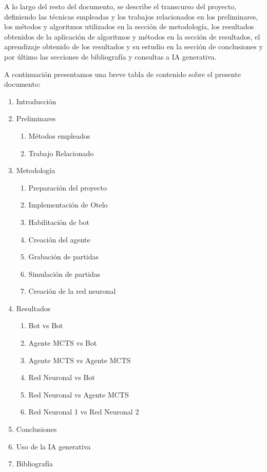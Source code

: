 \documentclass[conference,a4paper]{IEEEtran}
\begin{document}
A lo largo del resto del documento, se describe el transcurso del proyecto, definiendo las técnicas
empleadas y los trabajos relacionados en los preliminares, los métodos y algoritmos utilizados en la
sección de metodología, los resultados obtenidos de la aplicación de algoritmos y métodos en la sección
de resultados, el aprendizaje obtenido de los resultados y su estudio en la sección de conclusiones y
por último las secciones de bibliografía y consultas a IA generativa.

A continuación presentamos una breve tabla de contenido sobre el presente documento:

\begin{enumerate}
  \item Introducción
  \item Preliminares
  \begin{enumerate}
    \item Métodos empleados
    \item Trabajo Relacionado
  \end{enumerate}
  \item Metodología
  \begin{enumerate}
    \item Preparación del proyecto
    \item Implementación de Otelo
    \item Habilitación de bot
    \item Creación del agente
    \item Grabación de partidas
    \item Simulación de partidas
    \item Creación de la red neuronal
  \end{enumerate}
  \item Resultados
  \begin{enumerate}
    \item Bot vs Bot
    \item Agente MCTS vs Bot
    \item Agente MCTS vs Agente MCTS
    \item Red Neuronal vs Bot
    \item Red Neuronal vs Agente MCTS
    \item Red Neuronal 1 vs Red Neuronal 2
  \end{enumerate}
  \item Conclusiones
  \item Uso de la IA generativa
  \item Bibliografía
\end{enumerate}
\end{document}
